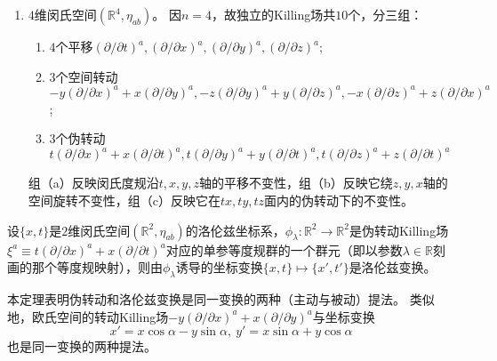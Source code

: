 \begin{example}
\begin{enumerate}[（1）]
		\item $4$维闵氏空间$(\mathbb{R}^4, \eta_{ab})$。
		      因$n = 4$，故独立的Killing场共$10$个，分三组：
		      \begin{enumerate}[（a）]
			      \item $4$个平移$(\partial / \partial t)^a, (\partial / \partial x)^a, (\partial / \partial y)^a, (\partial / \partial z)^a$;
			      \item $3$个空间转动$-y(\partial / \partial x)^a + x(\partial / \partial y)^a, -z(\partial / \partial y)^a + y(\partial / \partial z)^a, -x(\partial / \partial z)^a + z(\partial / \partial x)^a$;
			      \item $3$个伪转动$t(\partial / \partial x)^a + x(\partial / \partial t)^a, t(\partial / \partial y)^a + y(\partial / \partial t)^a, t(\partial / \partial z)^a + z(\partial / \partial t)^a$
		      \end{enumerate}
		      组（a）反映闵氏度规沿$t, x, y, z$轴的平移不变性，组（b）反映它绕$z, y, x$轴的空间旋转不变性，组（c）反映它在$tx, ty, tz$面内的伪转动下的不变性。
	\end{enumerate}
\end{example}

\begin{theorem}
	设$\{x, t\}$是$2$维闵氏空间$(\mathbb{R}^2, \eta_{ab})$的洛伦兹坐标系，$\phi_\lambda \colon \mathbb{R}^2 \to \mathbb{R}^2$是伪转动Killing场$\xi^a \equiv t(\partial / \partial x)^a + x(\partial / \partial t)^a$对应的单参等度规群的一个群元（即以参数$\lambda \in \mathbb{R}$刻画的那个等度规映射），则由$\phi_\lambda$诱导的坐标变换$\{x, t\} \mapsto \{x', t'\}$是洛伦兹变换。
\end{theorem}

\begin{note}
	本定理表明伪转动和洛伦兹变换是同一变换的两种（主动与被动）提法。
	类似地，欧氏空间的转动Killing场$-y(\partial / \partial x)^a + x(\partial / \partial y)^a$与坐标变换
	$$x' = x\cos\alpha - y\sin\alpha, ~ y' = x\sin\alpha + y\cos\alpha$$
	也是同一变换的两种提法。
\end{note}

